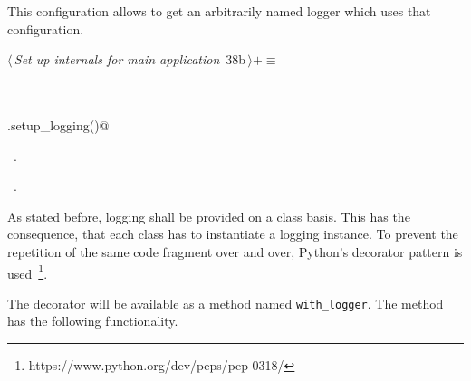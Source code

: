\documentclass[
    a4paper,      %
    10pt,         %
    openright,    %
    notitlepage,  %
    parskip=half, %
]{scrreprt}       %
\theoremstyle{definition}                    %
\begin{document}
This configuration allows to get an arbitrarily named logger which uses that
configuration.

\begin{flushleft} \small
\begin{minipage}{\linewidth}\label{scrap47}\raggedright\small
{} $\langle\,${\itshape Set up internals for main application}\nobreak\ {\footnotesize {38b}}$\,\rangle+\equiv$
\vspace{-1ex}
\begin{list}{}{} \item
\mbox{}\lstinline@@\\
\mbox{}\lstinline@@\\
\mbox{}\lstinline@self.setup_logging()@{\NWsep}
\end{list}
\vspace{-1.5ex}
\footnotesize
\begin{list}{}{\setlength{\itemsep}{-\parsep}\setlength{\itemindent}{-\leftmargin}}
\item \NWtxtMacroDefBy\ .
\item \NWtxtMacroRefIn\ .

\item{}
\end{list}
\end{minipage}\vspace{4ex}
\end{flushleft}
As stated before, logging shall be provided on a class basis. This has the
consequence, that each class has to instantiate a logging instance. To prevent
the repetition of the same code fragment over and over, Python's decorator
pattern is used~\footnote{https://www.python.org/dev/peps/pep-0318/}.

The decorator will be available as a method named \verb+with_logger+.
The method has the following functionality.
\end{document}
